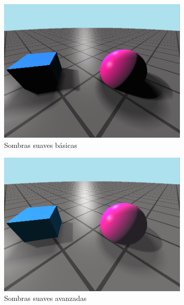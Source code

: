 \begin{figure}[ht!]
\begin{subfigure}[b]{0.3\textwidth}
        \includegraphics[width=\textwidth]{Plantilla-TFG-master/img/escena5_sombraSuave1.png}
        \caption{Sombras suaves básicas}
    \end{subfigure}
    \hfill
    \begin{subfigure}[b]{0.3\textwidth}
        \centering
        \includegraphics[width=\textwidth]{Plantilla-TFG-master/img/escena6_sombraSuave2.png}
        \caption{Sombras suaves avanzadas}
    \end{subfigure}
    \medskip
    \begin{subfigure}[b]{0.45\textwidth}
        \centering

\end{subfigure}
\end{figure}
